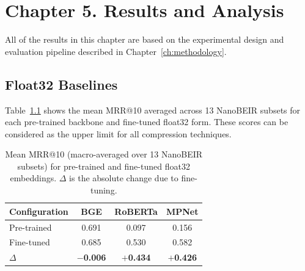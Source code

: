 
\chapter{Chapter 5. Results and Analysis}
\label{ch:results}

All of the results in this chapter are based on the experimental design
and evaluation pipeline described in Chapter~\ref{ch:methodology}.

\section{Float32 Baselines}
\label{sec:float32_baselines}

Table~\ref{tab:float32_baselines} shows the mean MRR@10 averaged across
13 NanoBEIR subsets for each pre-trained backbone and fine-tuned float32
form. These scores can be considered as the upper limit for all
compression techniques.

\begin{table}[H]
  \centering
  \caption[Float32 baselines: pre-trained vs fine-tuned.]{Mean MRR@10 (macro-averaged over 13 NanoBEIR subsets) for pre-trained and fine-tuned float32 embeddings. $\Delta$ is the absolute change due to fine-tuning.}
  \label{tab:float32_baselines}
  \begin{tabular}{| l | c | c | c |}
    \hline
    \textbf{Configuration} & \textbf{BGE} & \textbf{RoBERTa} & \textbf{MPNet} \\ [0.5ex] \hline
    Pre-trained            & 0.691 & 0.097 & 0.156 \\ \hline
    Fine-tuned             & 0.685 & 0.530 & 0.582 \\ \hline
    \textbf{$\Delta$}      & $\mathbf{-}$\textbf{0.006} & $\mathbf{+}$\textbf{0.434} & $\mathbf{+}$\textbf{0.426} \\ \hline
  \end{tabular}
\end{table}


